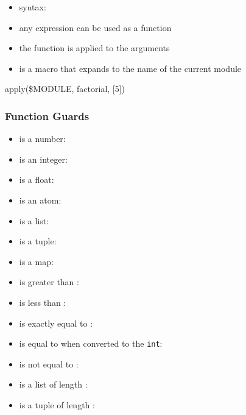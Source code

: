 \documentclass[a4paper,landscape,10pt]{article}
\begin{document}
\begin{multicols*}{2}
  \begin{itemize}
    \item syntax: 
    \item any expression can be used as a function
    \item the function is applied to the arguments
    \item {} is a macro that expands to the name of the current module
  \end{itemize}

  \begin{erlang}
apply(\$MODULE, factorial, [5]) %
\end{erlang}

  \subsubsection{Function Guards}

  \begin{itemize}
    \item {} is a number: 
    \item {} is an integer: 
    \item {} is a float: 
    \item {} is an atom: 
    \item {} is a list: 
    \item {} is a tuple: 
    \item {} is a map: 
    \item {} is greater than : 
    \item {} is less than : 
    \item {} is exactly equal to : 
    \item {} is equal to  when converted to the \texttt{int}: 
    \item {} is not equal to : 
    \item {} is a list of length : 
    \item {} is a tuple of length : 
  \end{itemize}


\end{multicols*}
\end{document}
